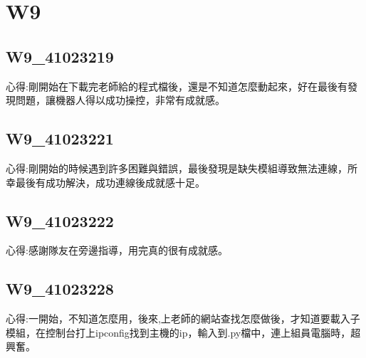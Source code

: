 \chapter{W9}


\section{W9\_41023219}

心得:剛開始在下載完老師給的程式檔後，還是不知道怎麼動起來，好在最後有發現問題，讓機器人得以成功操控，非常有成就感。



\section{W9\_41023221}

心得:剛開始的時候遇到許多困難與錯誤，最後發現是缺失模組導致無法連線，所幸最後有成功解決，成功連線後成就感十足。



\section{W9\_41023222}

心得:感謝隊友在旁邊指導，用完真的很有成就感。

\section{W9\_41023228}

心得:一開始，不知道怎麼用，後來,上老師的網站查找怎麼做後，才知道要載入子模組，在控制台打上ipconfig找到主機的ip，輸入到.py檔中，連上組員電腦時，超興奮。

